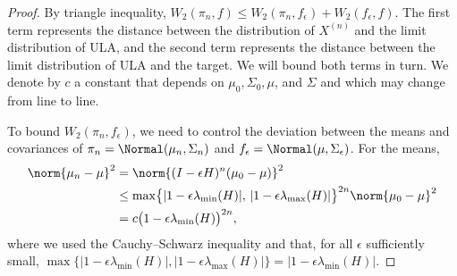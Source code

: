 \begin{proof}
By triangle inequality, $W_2(\pi_n, f) \le W_2(\pi_n, f_\epsilon) + W_2(f_\epsilon, f)$.
The first term represents the distance between the distribution of $X^{(n)}$ and the limit
distribution of ULA, and the second term represents the distance between the limit distribution
of ULA and the target. We will bound both terms in turn. We denote by $c$ a constant that
depends on $\mu_0, \Sigma_0, \mu$, and $\Sigma$ and which may change from line to line.

To bound $W_2(\pi_n, f_\epsilon)$, we need to control the deviation between the means and
covariances of $\pi_n = \Normal(\mu_n, \Sigma_n)$ and $f_\epsilon = \Normal(\mu, \Sigma_\epsilon)$.
For the means,
\begin{align*}
  \norm{\mu_n - \mu}^2
  &= \norm{(I-\epsilon H)^n(\mu_0 - \mu)}^2 \\
  &\le \max\bigl\{|1-\epsilon\lambda_{\min}(H)|,\,|1-\epsilon\lambda_{\max}(H)|\bigr\}^{2n}
     \norm{\mu_0-\mu}^2 \\
  &= c\bigl(1 - \epsilon\lambda_{\min}(H)\bigr)^{2n},
\end{align*}
where we used the Cauchy--Schwarz inequality and that, for all $\epsilon$ sufficiently small,
$\max\{|1-\epsilon\lambda_{\min}(H)|,|1-\epsilon\lambda_{\max}(H)|\} = |1-\epsilon\lambda_{\min}(H)|$.


\end{proof}
